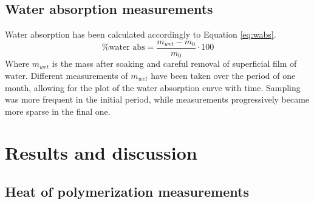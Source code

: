 \documentclass[a4paper, 11pt]{article}
\begin{document}
\subsection{Water absorption measurements}

Water absorption has been calculated accordingly to Equation \ref{eq:wabs}.
\begin{equation}
\%\text{water abs} = \frac{m_{wet}-m_0}{m_0}\cdot 100
\label{eq:wabs} 
\end{equation}
Where $m_{wet}$ is the mass after soaking and careful removal of superficial film of water. Different measurements of $m_{wet}$ have been taken over the period of one month, allowing for the plot of the water absorption curve with time. Sampling was more frequent in the initial period, while measurements progressively became more sparse in the final one. 

\section{Results and discussion}

\subsection{Heat of polymerization measurements}
\end{document}
